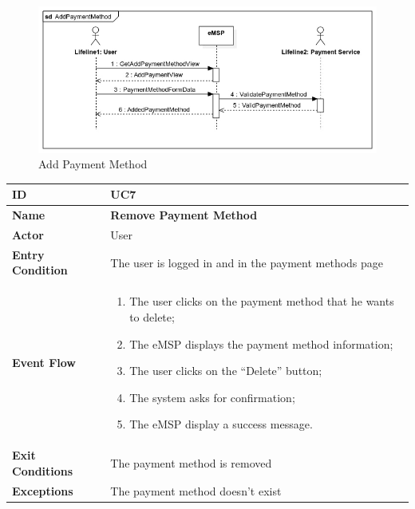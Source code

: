 \documentclass{Configuration_Files/PoliMi3i_thesis}
\begin{document}
\begin{figure}[H]
    \centering
    \includegraphics[width=1\textwidth]{Images/UseCases/AddPaymentMethod.jpg}
    \caption{Add Payment Method}
\end{figure}


\begin{table}[H]
    \begin{xltabular}{\textwidth}{| >{}l | X |}
    \hline
    \textbf{ID} & \textbf{UC7}\T\B\\
    \hline
    \textbf{Name} & \textbf{Remove Payment Method}\T\B\\
    \hline \hline
    \textbf{Actor} & User\T\B \\
    \hline
    \textbf{Entry Condition} & The user is logged in and in the payment methods page\T\B\\
    \hline
    \textbf{Event Flow} & 
        \begin{enumerate}
        \item The user clicks on the payment method that he wants to delete;
        \item The eMSP displays the payment method information;
        \item The user clicks on the “Delete” button;
        \item The system asks for confirmation;
        \item The eMSP display a success message.
        \end{enumerate}\B\\
    \hline
    \textbf{Exit Conditions} & The payment method is removed\B\\
    \hline
    \textbf{Exceptions} & The payment method doesn’t exist\B\\
    \hline
    \end{xltabular}
\end{table}
\end{document}
